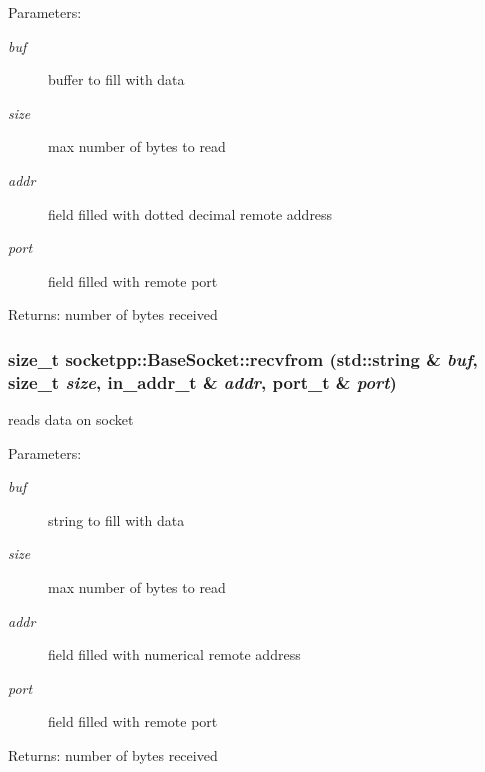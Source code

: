 \begin{CompactItemize}
\begin{Desc}
\item[Parameters:]
\begin{description}
\item[{\em buf}]buffer to fill with data \item[{\em size}]max number of bytes to read \item[{\em addr}]field filled with dotted decimal remote address \item[{\em port}]field filled with remote port \end{description}
\end{Desc}
\begin{Desc}
\item[Returns:]number of bytes received \end{Desc}
\hypertarget{classsocketpp_1_1BaseSocket_d2656c57d84c4ff032cd3d9ad4608bfa}{
\subsubsection[{recvfrom}]{\setlength{\rightskip}{0pt plus 5cm}size\_\-t socketpp::BaseSocket::recvfrom (std::string \& {\em buf}, \/  size\_\-t {\em size}, \/  in\_\-addr\_\-t \& {\em addr}, \/  {\bf port\_\-t} \& {\em port})}}
\label{classsocketpp_1_1BaseSocket_d2656c57d84c4ff032cd3d9ad4608bfa}


reads data on socket 

\begin{Desc}
\item[Parameters:]
\begin{description}
\item[{\em buf}]string to fill with data \item[{\em size}]max number of bytes to read \item[{\em addr}]field filled with numerical remote address \item[{\em port}]field filled with remote port \end{description}
\end{Desc}
\begin{Desc}
\item[Returns:]number of bytes received \end{Desc}
\hypertarget{classsocketpp_1_1BaseSocket_11ebe50d7ae76c21ef55d38cb87cc700}{
}
\end{CompactItemize}
